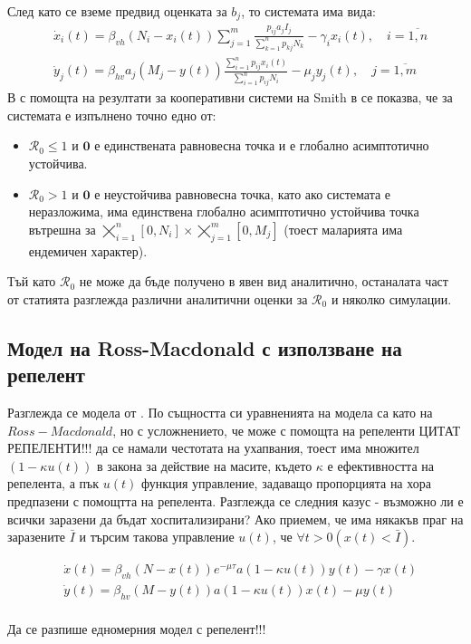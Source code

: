 След като се вземе предвид оценката за $b_j$, то системата има вида:
\begin{equation}
  \label{eq:MigrationProblem}
  \begin{split}
    &\dot{x}_i(t) = \beta_{vh} (N_i - x_i(t)) \sum_{j=1}^{m} \frac{p_{ij} a_j I_j}{\sum_{k=1}^n p_{kj} N_k} - \gamma_i x_i(t), \quad i=\overline{1, n} \\
    &\dot{y}_j(t) = \beta_{hv} a_j (M_j - y(t)) \frac{\sum_{i=1}^n p_{ij} x_i(t)}{\sum_{i=1}^n p_{ij} N_i} - \mu_j y_j(t), \quad j=\overline{1, m}
  \end{split}
  \end{equation}
В \cite{Bichara2016} с помощта на резултати за кооперативни системи на Smith в \cite{Smith1986} се показва, че за системата е изпълнено точно едно от:
\begin{itemize}
  \item $\mathscr{R}_0 \leq 1$ и $\mathbf{0}$ е единствената равновесна точка и е глобално асимптотично устойчива.
  \item $\mathscr{R}_0 > 1$ и $\mathbf{0}$ е неустойчива равновесна точка, като ако системата е неразложима, има единствена глобално асимптотично устойчива точка вътрешна за $\bigtimes_{i=1}^{n} [0, N_i] \times \bigtimes_{j=1}^{m} [0, M_j]$ (тоест маларията има ендемичен характер).
\end{itemize}

Тъй като $\mathscr{R}_0$ не може да бъде получено в явен вид аналитично, останалата част от статията \cite{Bichara2016} разглежда различни аналитични оценки за $\mathscr{R}_0$ и няколко симулации.

\subsection{Модел на Ross-Macdonald с използване на репелент}
Разглежда се модела от \cite{Rashkov2019}. По същността си уравненията на модела са като на $Ross-Macdonald$, но с усложнението, че може с помощта на репеленти \color{Red} ЦИТАТ РЕПЕЛЕНТИ!!!
\color{Black} да се намали честотата на ухапвания, тоест има множител $(1 - \kappa u(t))$ в закона за действие на масите, където $\kappa$ е ефективността на репелента, а пък $u(t)$ функция управление, задаващо пропорцията на хора предпазени с помощтта на репелента.
Разглежда се следния казус - възможно ли е всички заразени да бъдат хоспитализирани? Ако приемем, че има някакъв праг на заразените $\bar{I}$ и търсим такова управление $u(t)$, че $\forall t>0 (x(t) < \bar{I})$.

\begin{equation}
  \label{eq:RepelentProblem}
  \begin{split}
    &\dot{x}(t) = \beta_{vh} (N-x(t)) e^{-\mu \tau} a (1-\kappa u(t)) y(t) - \gamma x(t) \\
    &\dot{y}(t) = \beta_{hv} (M-y(t)) a (1-\kappa u(t)) x(t) - \mu y(t) \\
  \end{split}
\end{equation}

\color{Red} Да се разпише едномерния модел с репелент!!!
\color{Black} \\
